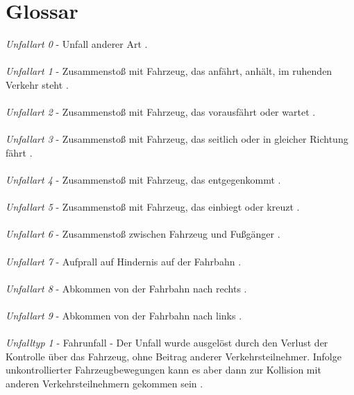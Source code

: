 
 {}
\renewcommand\refname{Glossa} \chapter*{Glossar}
\textit{Unfallart 0} - Unfall anderer Art \parencite{PolizeiprasidiumOberbeyernSud.2016}.\\
\\
\textit{Unfallart 1} - Zusammenstoß mit Fahrzeug, das anfährt, anhält, im ruhenden Verkehr steht \parencite{PolizeiprasidiumOberbeyernSud.2016}.\\
\\
\textit{Unfallart 2} - Zusammenstoß mit Fahrzeug, das vorausfährt oder wartet \parencite{PolizeiprasidiumOberbeyernSud.2016}.\\
\\
\textit{Unfallart 3} - Zusammenstoß mit Fahrzeug, das seitlich oder in gleicher Richtung fährt \parencite{PolizeiprasidiumOberbeyernSud.2016}.\\
\\
\textit{Unfallart 4} - Zusammenstoß mit Fahrzeug, das entgegenkommt \parencite{PolizeiprasidiumOberbeyernSud.2016}.\\
\\
\textit{Unfallart 5} - Zusammenstoß mit Fahrzeug, das einbiegt oder kreuzt \parencite{PolizeiprasidiumOberbeyernSud.2016}.\\
\\
\textit{Unfallart 6} - Zusammenstoß zwischen Fahrzeug und Fußgänger \parencite{PolizeiprasidiumOberbeyernSud.2016}.\\
\\
\textit{Unfallart 7} - Aufprall auf Hindernis auf der Fahrbahn \parencite{PolizeiprasidiumOberbeyernSud.2016}.\\
\\
\textit{Unfallart 8} - Abkommen von der Fahrbahn nach rechts \parencite{PolizeiprasidiumOberbeyernSud.2016}.\\
\\
\textit{Unfallart 9} - Abkommen von der Fahrbahn nach links \parencite{PolizeiprasidiumOberbeyernSud.2016}.\\
\\
\textit{Unfalltyp 1} - Fahrunfall - Der Unfall wurde ausgelöst durch den Verlust der Kontrolle über das Fahrzeug, ohne Beitrag anderer Verkehrsteilnehmer. Infolge unkontrollierter Fahrzeugbewegungen kann es aber dann zur Kollision mit anderen Verkehrsteilnehmern gekommen sein \parencite{PolizeiprasidiumOberbeyernSud.2016}.\\
